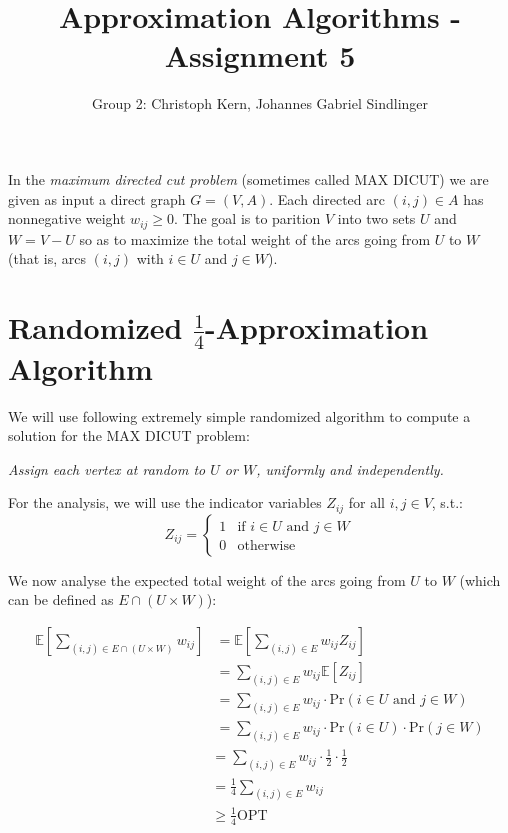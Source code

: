 \documentclass{article}
\title{Approximation Algorithms - Assignment 5}
\author{Group 2: Christoph Kern, Johannes Gabriel Sindlinger}
\begin{document}
\maketitle

In the \emph{maximum directed cut problem} (sometimes called MAX DICUT) we are given as input a direct graph $G=(V,A)$. Each directed arc $(i,j) \in A$ has nonnegative weight $w_{ij} \ge 0$. The goal is to parition $V$ into two sets $U$ and $W = V - U$ so as to maximize the total weight of the arcs going from $U$ to $W$ (that is, arcs $(i,j)$ with $i \in U$ and $j \in W$).

\section{Randomized $\frac{1}{4}$-Approximation Algorithm}

We will use following extremely simple randomized algorithm to compute a solution for the MAX DICUT problem:
\vspace{1em}

\emph{Assign each vertex at random to $U$ or $W$, uniformly and independently.}
\vspace{1em}

For the analysis, we will use the indicator variables $Z_{ij}$ for all $i,j\in V$, s.t.:
\[
    Z_{ij} = \begin{cases}
        1 & \text{if }i \in U\text{ and }j \in W\\
        0 & \text{otherwise}
    \end{cases}
\]

We now analyse the expected total weight of the arcs going from $U$ to $W$ (which can be defined as $E \cap (U \times W)$):

\begin{align}
    \mathbb{E}\left[\sum_{(i,j) \in E \cap (U \times W)} w_{ij}\right]&=\mathbb{E}\left[\sum_{(i,j) \in E} w_{ij} Z_{ij}\right] \label{eq1:1}\\
    &=\sum_{(i,j) \in E} w_{ij} \mathbb{E}\left[Z_{ij}\right] \label{eq1:2}\\
    &=\sum_{(i,j) \in E} w_{ij} \cdot \text{Pr}(i \in U \text{ and } j \in W) \label{eq1:3}\\
    &=\sum_{(i,j) \in E} w_{ij} \cdot \text{Pr}(i \in U) \cdot \text{Pr}(j \in W) \label{eq1:4}
\end{align}
\begin{align}
    \quad\quad&=\sum_{(i,j) \in E} w_{ij} \cdot \frac{1}{2} \cdot \frac{1}{2} \label{eq1:5}\\
    &=\frac{1}{4} \sum_{(i,j) \in E} w_{ij} \label{eq1:6}\\
    &\ge\frac{1}{4} \text{OPT} \label{eq1:7}
\end{align}
\end{document}
